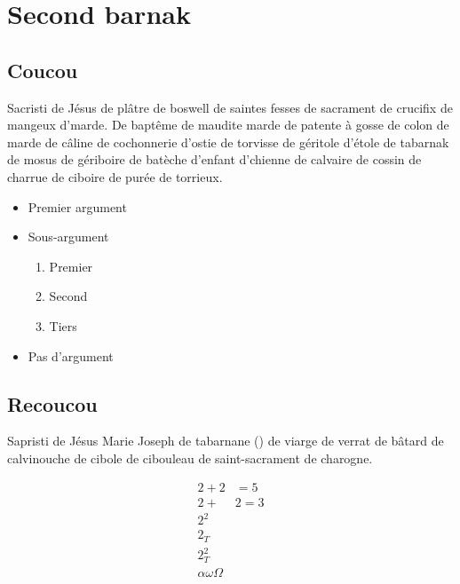 \section{Second barnak}
\subsection{Coucou}
Sacristi de Jésus de plâtre de boswell de saintes fesses de sacrament de crucifix de mangeux d'marde.
  De baptême de maudite marde de patente à gosse de colon de marde de câline de cochonnerie d'ostie de torvisse de géritole d'étole de tabarnak de mosus de gériboire de batèche d'enfant d'chienne de calvaire de cossin de charrue de ciboire de purée de torrieux.

\begin{itemize}
    \item Premier argument
    \item Sous-argument
        \begin{enumerate}
            \item Premier
            \item Second
            \item Tiers
        \end{enumerate}
    \item Pas d'argument
\end{itemize}

\subsection{Recoucou}
Sapristi de Jésus Marie Joseph de tabarnane () de viarge de verrat de bâtard de calvinouche  de cibole de cibouleau de saint-sacrament de charogne.

\begin{align}
    \label{eq:fausse}
    2 + 2 &= 5 \nonumber\\
    2 + &2 = 3 \\
    2^2 \\
    2_T \\
    2^2_T \\
    \alpha \omega \Omega
\end{align}